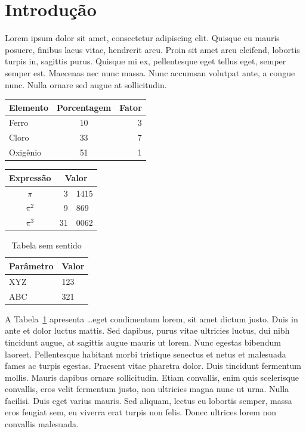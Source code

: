 \documentclass{article}
\begin{document}
	\section{Introdução}
	
	Lorem ipsum dolor sit amet, consectetur adipiscing elit. Quisque eu mauris posuere, finibus lacus vitae, hendrerit arcu. Proin sit amet arcu eleifend, lobortis turpis in, sagittis purus. Quisque mi ex, pellentesque eget tellus eget, semper semper est. Maecenas nec nunc massa. Nunc accumsan volutpat ante, a congue nunc. Nulla ornare sed augue at sollicitudin.
	\vspace{1cm}
	
	\begin{center}
		\begin{tabular}{l|c|r}
			\hline
			Elemento & Porcentagem & Fator \\
			\hline\hline
			Ferro & 10 & 3 \\ \hline
			Cloro & 33 & 7 \\ \hline
			Oxigênio & 51 & 1 \\ \hline
		\end{tabular}
	\end{center}
	
	\vspace{1cm}
	
	\begin{center}
		\begin{tabular}{c r @{,}l}
			Expressão & \multicolumn{2}{c}{Valor} \\ \hline
			$\pi$ & 3 & 1415 \\
			$\pi^2$ & 9 & 869 \\
			$\pi^3$ & 31 & 0062
		\end{tabular}
	\end{center}
	
	\vspace{1cm}
	
	\begin{table}[h]
		\caption{Tabela sem sentido} \label{tab:semsentido}
		\centering
		\begin{tabular}{l|l} \hline
			Parâmetro & Valor \\ \hline\hline
			XYZ & 123 \\
			ABC & 321 \\ \hline
		\end{tabular}
	\end{table}
	\vspace{1cm}
	
	A Tabela~\ref{tab:semsentido} apresenta \dots eget condimentum lorem, sit amet dictum justo. Duis in ante et dolor luctus mattis. Sed dapibus, purus vitae ultricies luctus, dui nibh tincidunt augue, at sagittis augue mauris ut lorem. Nunc egestas bibendum laoreet. Pellentesque habitant morbi tristique senectus et netus et malesuada fames ac turpis egestas. Praesent vitae pharetra dolor. Duis tincidunt fermentum mollis. Mauris dapibus ornare sollicitudin. Etiam convallis, enim quis scelerisque convallis, eros velit fermentum justo, non ultricies magna nunc ut urna. Nulla facilisi. Duis eget varius mauris. Sed aliquam, lectus eu lobortis semper, massa eros feugiat sem, eu viverra erat turpis non felis. Donec ultrices lorem non convallis malesuada.
	
\end{document}

